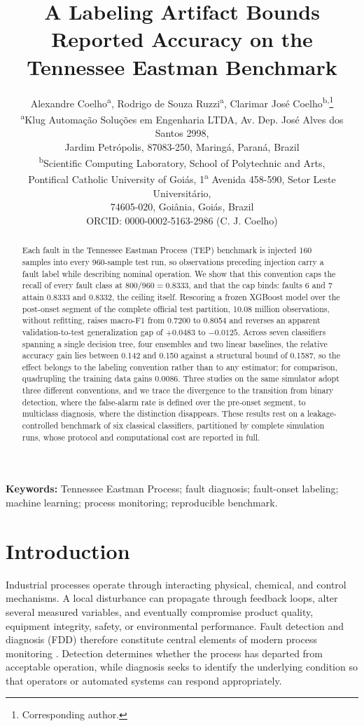 \documentclass[10pt,twocolumn,a4paper]{article}
\title{\Large\textbf{A Labeling Artifact Bounds Reported Accuracy on the\\
Tennessee Eastman Benchmark}}
\author{
Alexandre Coelho\textsuperscript{a},\;
Rodrigo de Souza Ruzzi\textsuperscript{a},\;
Clarimar Jos\'e Coelho\textsuperscript{b,}\thanks{Corresponding author.}\\[4pt]
\small \textsuperscript{a}Klug Automa\c{c}\~ao Solu\c{c}\~oes em Engenharia LTDA,
Av. Dep. Jos\'e Alves dos Santos 2998,\\
\small Jardim Petr\'opolis, 87083-250, Maring\'a, Paran\'a, Brazil\\[2pt]
\small \textsuperscript{b}Scientific Computing Laboratory, School of Polytechnic
and Arts,\\
\small Pontifical Catholic University of Goi\'as, 1\textsuperscript{a} Avenida
458-590, Setor Leste Universit\'ario,\\
\small 74605-020, Goi\^ania, Goi\'as, Brazil\\[2pt]
\small ORCID: 0000-0002-5163-2986 (C. J. Coelho)}
\date{}
\begin{document}
\maketitle

\begin{abstract}
Each fault in the Tennessee Eastman Process (TEP) benchmark is injected 160
samples into every 960-sample test run, so observations preceding injection
carry a fault label while describing nominal operation. We show that this
convention caps the recall of every fault class at $800/960=0.8333$, and that
the cap binds: faults 6 and 7 attain 0.8333 and 0.8332, the ceiling itself.
Rescoring a frozen XGBoost model over the post-onset segment of the complete
official test partition, 10.08 million observations, without refitting, raises
macro-F1 from 0.7200 to 0.8054 and reverses an apparent validation-to-test
generalization gap of $+0.0483$ to $-0.0125$. Across seven classifiers spanning
a single decision tree, four ensembles and two linear baselines, the relative
accuracy gain lies between 0.142 and 0.150 against a structural bound of
0.1587, so the effect belongs to the labeling convention rather than to any
estimator; for comparison, quadrupling the training data gains 0.0086. Three
studies on the same simulator adopt three different conventions, and we trace
the divergence to the transition from binary detection, where the false-alarm
rate is defined over the pre-onset segment, to multiclass diagnosis, where the
distinction disappears. These results rest on a leakage-controlled benchmark of
six classical classifiers, partitioned by complete simulation runs, whose
protocol and computational cost are reported in full.
\end{abstract}

\noindent\textbf{Keywords:} Tennessee Eastman Process; fault diagnosis;
fault-onset labeling; machine learning; process monitoring; reproducible
benchmark.

\section{Introduction}

Industrial processes operate through interacting physical, chemical, and
control mechanisms. A local disturbance can propagate through feedback loops,
alter several measured variables, and eventually compromise product quality,
equipment integrity, safety, or environmental performance. Fault detection and
diagnosis (FDD) therefore constitute central elements of modern process
monitoring \cite{venkatasubramanian2003review,yin2014review,ji2022review}.
Detection determines whether the process has departed from acceptable
operation, while diagnosis seeks to identify the underlying condition so that
operators or automated systems can respond appropriately.
\end{document}
